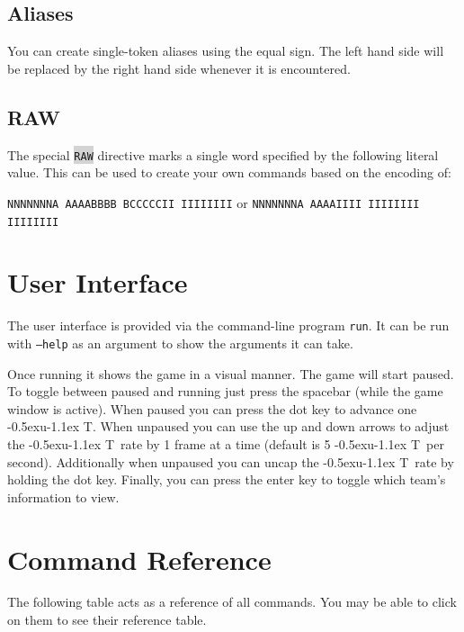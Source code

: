 \documentclass{article}
\newcommand{\vnscode}[1]{\colorbox{lightgray}{\lstinline[language=vns]{#1}}}
\newcommand{\UT}{\lower-0.5ex\hbox{u}\kern-1.1ex T}
\begin{document}
\subsection{Aliases}

You can create single-token aliases using the equal sign. The left hand side
will be replaced by the right hand side whenever it is encountered.

\subsection{RAW}

The special \vnscode{RAW} directive marks a single word specified by the
following literal value. This can be used to create your own commands based on
the encoding of:

\texttt{NNNNNNNA AAAABBBB BCCCCCII IIIIIIII} or \texttt{NNNNNNNA AAAAIIII IIIIIIII IIIIIIII}

\section{User Interface}

The user interface is provided via the command-line program \texttt{run}. It can
be run with \texttt{--help} as an argument to show the arguments it can take.

Once running it shows the game in a visual manner. The game will start paused.
To toggle between paused and running just press the spacebar (while the game
window is active). When paused you can press the dot key to advance one \UT.
When unpaused you can use the up and down arrows to adjust the \UT\ rate by 1
frame at a time (default is 5 \UT\ per second). Additionally when unpaused you
can uncap the \UT\ rate by holding the dot key. Finally, you can press the enter
key to toggle which team's information to view.

\section{Command Reference}

The following table acts as a reference of all commands. You may be able to
click on them to see their reference table.
\end{document}
